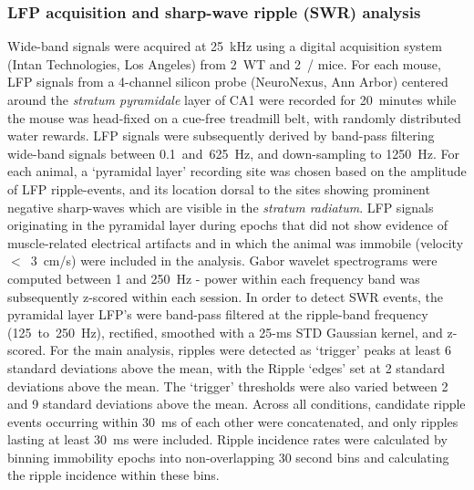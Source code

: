 \subsubsection{LFP acquisition and sharp-wave ripple (SWR) analysis}
\label{sec:df:methods:SWR}
Wide-band signals were acquired at 25~kHz using a digital acquisition system (Intan Technologies, Los Angeles) from 2~WT and 2~\df/ mice. For each mouse, LFP signals from a 4-channel silicon probe (NeuroNexus, Ann Arbor) centered around the \emph{stratum pyramidale} layer of CA1 were recorded for 20~minutes while the mouse was head-fixed on a cue-free treadmill belt, with randomly distributed water rewards. LFP signals were subsequently derived by band-pass filtering wide-band signals between 0.1~and~625~Hz, and down-sampling to 1250~Hz. For each animal, a `pyramidal layer' recording site was chosen based on the amplitude of LFP ripple-events, and its location dorsal to the sites showing prominent negative sharp-waves which are visible in the \emph{stratum radiatum}. LFP signals originating in the pyramidal layer during epochs that did not show evidence of muscle-related electrical artifacts and in which the animal was immobile (velocity $<$~3~cm/s) were included in the analysis. Gabor wavelet spectrograms were computed between 1 and 250~Hz - power within each frequency band was subsequently z-scored within each session. In order to detect SWR events, the pyramidal layer LFP's were band-pass filtered at the ripple-band frequency (125~to~250~Hz), rectified, smoothed with a 25-ms STD Gaussian kernel, and z-scored. For the main analysis, ripples were detected as `trigger' peaks at least 6 standard deviations above the mean, with the Ripple `edges' set at 2 standard deviations above the mean. The `trigger' thresholds were also varied between 2 and 9 standard deviations above the mean. Across all conditions, candidate ripple events occurring within 30~ms of each other were concatenated, and only ripples lasting at least 30~ms were included. Ripple incidence rates were calculated by binning immobility epochs into non-overlapping 30 second bins and calculating the ripple incidence within these bins.

